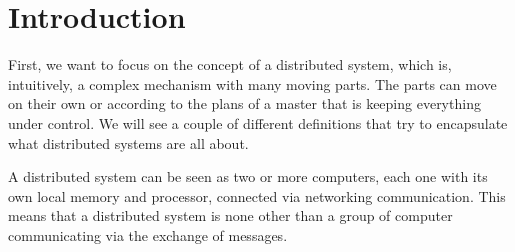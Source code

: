 \chapter{Introduction}
First, we want to focus on the concept of a distributed system, which is, intuitively, a complex mechanism with many moving parts. The parts can move on their own or according to the plans of a master that is keeping everything under control. We will see a couple of different definitions that try to encapsulate what distributed systems are all about.

A distributed system can be seen as two or more computers, each one with its own local memory and processor, connected via networking communication. This means that a distributed system is none other than a group of computer communicating via the exchange of messages.


